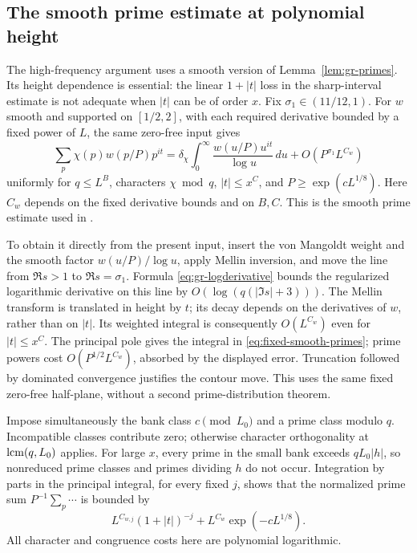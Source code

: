 \subsection{The smooth prime estimate at polynomial height}

The high-frequency argument uses a smooth version of
Lemma~\ref{lem:gr-primes}. Its height dependence is essential:
the linear \(1+|t|\) loss in the sharp-interval estimate is not
adequate when \(|t|\) can be of order \(x\).
Fix \(\sigma_1\in(11/12,1)\). For \(w\) smooth and supported on
\([1/2,2]\), with each required derivative bounded by a fixed
power of \(L\), the same zero-free input gives
\begin{equation}\label{eq:fixed-smooth-primes}
 \sum_p\chi(p)w(p/P)p^{it}
  =\delta_\chi\int_0^\infty\frac{w(u/P)u^{it}}{\log u}\,du
                       +O(P^{\sigma_1}L^{C_w})
\end{equation}
uniformly for \(q\le L^B\), characters \(\chi\bmod q\),
\(|t|\le x^C\), and \(P\ge\exp(cL^{1/8})\).
Here \(C_w\) depends on the fixed derivative bounds and on \(B,C\).
This is the smooth prime estimate used in
\cite[Lemma 5.1 and Section 6.4]{walsh}.

To obtain it directly from the present input, insert the von
Mangoldt weight and the smooth factor \(w(u/P)/\log u\), apply
Mellin inversion, and move the line from \(\Re s>1\) to
\(\Re s=\sigma_1\). Formula \eqref{eq:gr-logderivative} bounds
the regularized logarithmic derivative on this line by
\(O(\log(q(|\Im s|+3)))\). The Mellin transform is translated
in height by \(t\); its decay depends on the derivatives of
\(w\), rather than on \(|t|\). Its weighted integral is consequently
\(O(L^{C_w})\) even for \(|t|\le x^C\). The principal pole
gives the integral in \eqref{eq:fixed-smooth-primes}; prime powers
cost \(O(P^{1/2}L^{C_w})\), absorbed by the displayed error.
Truncation followed by dominated convergence justifies the contour
move. This uses the same fixed zero-free half-plane, without a
second prime-distribution theorem.

Impose simultaneously the bank class \(c\pmod{L_0}\) and a
prime class modulo \(q\). Incompatible classes contribute zero;
otherwise character orthogonality at \(\operatorname{lcm}(q,L_0)\) applies.
For large \(x\), every prime in the small bank exceeds
\(qL_0|h|\), so nonreduced prime classes and primes dividing
\(h\) do not occur. Integration by parts in the principal
integral, for every fixed \(j\), shows that the normalized
prime sum \(P^{-1}\sum_p\cdots\) is bounded by
\begin{equation}\label{eq:fixed-high-prime}
        L^{C_{w,j}}(1+|t|)^{-j}
                       +L^{C_w}\exp(-cL^{1/8}).
\end{equation}
All character and congruence costs here are polynomial logarithmic.

